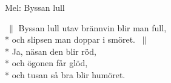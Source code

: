 \begin{SongText}
    \begin{SongInfo}
        Mel: Byssan lull
    \end{SongInfo}
    \begin{SongVerse}
        $\:\|$ Byssan lull utav brännvin blir man full,\\*%
        och slipsen man doppar i smöret. $\:\|$\\*%
        Ja, näsan den blir röd,\\*%
        och ögonen får glöd,\\*%
        och tusan så bra blir humöret.
    \end{SongVerse}
\end{SongText}
